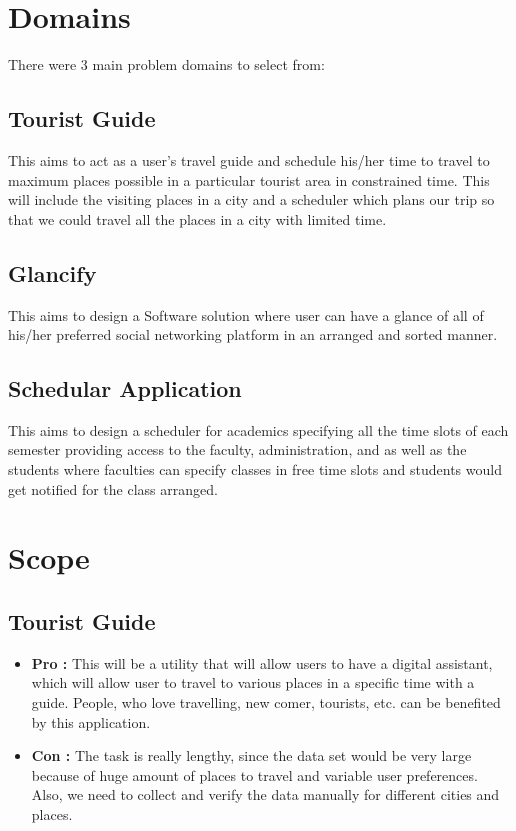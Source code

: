 \documentclass[12pt]{article}
\begin{document}
    \section{Domains}
    There were 3 main problem domains to select from:
    \subsection{Tourist Guide}
    This aims to act as a user's travel guide and schedule his/her time to travel to maximum places possible in a particular tourist area in constrained time.
     This will include the visiting places in a city and a scheduler which plans our trip so that we could travel all the places in a city with limited time.

    
    \subsection{Glancify}
    This aims to design a Software solution where user can have a glance of all of his/her preferred social networking platform in an arranged and sorted manner.
    
    \subsection{Schedular Application}
    This aims to design a scheduler for academics specifying all the time slots of each semester providing access to the faculty, administration, and as well as the students where faculties can specify classes in free time slots and students would get notified for the class arranged.
    
    \section{Scope}
    \subsection{Tourist Guide}
    
    \begin{itemize}
        \item \textbf{Pro :} This will be a utility that will allow users to have a digital assistant, which will allow user to travel to various places in a specific time with a guide. People, who love travelling, new comer, tourists, etc. can be benefited by this application. 
        \item \textbf{Con :} The task is really lengthy, since the data set would be very large because of huge amount of places to travel and variable user preferences. Also, we need to collect and verify the data manually for different cities and places.
    \end{itemize}
    
\end{document}
